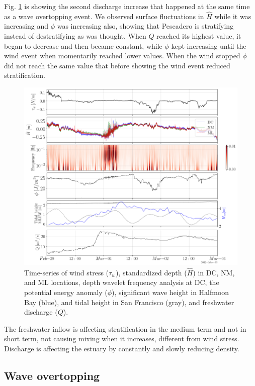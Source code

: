 \documentclass[tesis.tex]{subfiles}
\begin{document}
Fig. \ref{fig:mix_q} is showing the second discharge increase that happened at the same time as a wave overtopping event. We observed surface fluctuations in $\hat{H}$ while it was increasing and $\phi$ was increasing also, showing that Pescadero is stratifying instead of destratifying as was thought. When $Q$ reached its highest value, it began to decrease and then became constant, while $\phi$ kept increasing until the wind event when momentarily reached lower values. When the wind stopped $\phi$ did not reach the same value that before showing the wind event reduced stratification.\\

\begin{figure}[h!]
    \centering
    \includegraphics[width=\textwidth]{Imagenes/mix_q2.png}
    \caption{Time-series of wind stress ($\tau_w$), standardized depth ($\hat{H}$) in DC, NM, and ML locations, depth wavelet frequency analysis at DC, the potential energy anomaly ($\phi$), significant wave height in Halfmoon Bay (blue), and tidal height in San Francisco (gray), and freshwater discharge ($Q$). }
    \label{fig:mix_q}
\end{figure}

The freshwater inflow is affecting stratification in the medium term and not in short term, not causing mixing when it increases, different from wind stress. Discharge is affecting the estuary by constantly and slowly reducing density.\\

\subsection{Wave overtopping}
\end{document}
